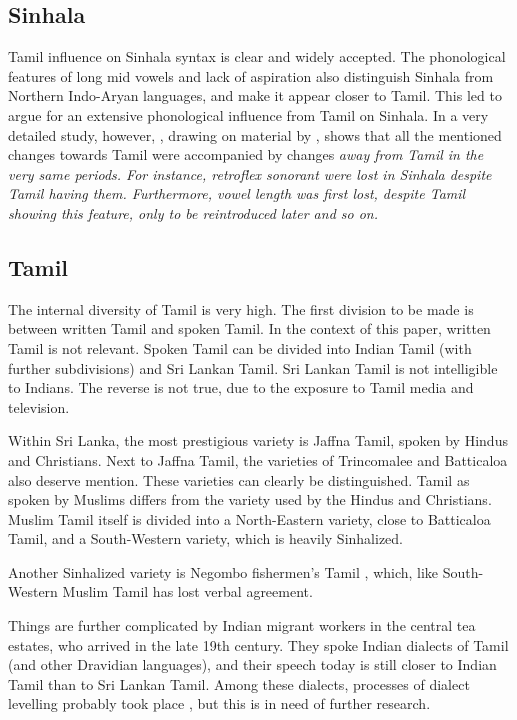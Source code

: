 \documentclass[handout,utf8]{article}
\begin{document}
\subsection{Sinhala}
Tamil influence on Sinhala syntax is clear and widely accepted. The phonological features of long mid vowels and lack of aspiration also distinguish Sinhala from Northern Indo-Aryan languages, and make it appear closer to Tamil. This led \citet{Elizarenkova1972} to argue for an extensive phonological influence from Tamil on Sinhala. In a very detailed study, however, \citet{Gair1976}, drawing on material by \citet{Karunatillake}, shows that all the mentioned changes towards Tamil were accompanied by changes \em away \em from Tamil in the very same periods. For instance, retroflex sonorant were lost in Sinhala despite Tamil having them. Furthermore, vowel length was first lost, despite Tamil showing this feature, only to be reintroduced later and so on.

\subsection{Tamil}
The internal diversity of Tamil is very high. The first division to be made is between written Tamil and spoken Tamil. In the context of this paper, written Tamil is not relevant. Spoken Tamil  can be divided into Indian Tamil (with further subdivisions) and Sri Lankan Tamil. Sri Lankan Tamil is not intelligible to Indians. The reverse is not true, due to the exposure to Tamil media and television. 

Within Sri Lanka, the most prestigious variety is Jaffna Tamil, spoken by Hindus and Christians. Next to Jaffna Tamil, the varieties of Trincomalee and Batticaloa also deserve mention. These varieties can clearly be distinguished. Tamil as spoken by Muslims differs from the variety used by the Hindus and Christians. Muslim Tamil itself is divided into a North-Eastern variety, close to Batticaloa Tamil, and a South-Western variety, which is heavily Sinhalized. 

Another Sinhalized variety is Negombo fishermen's Tamil \citep{Bonta}, which, like South-Western Muslim Tamil has lost verbal agreement. 

Things are further complicated by Indian migrant workers in the central tea estates, who arrived in the late 19th century. They spoke Indian dialects of Tamil (and other Dravidian languages), and their speech today is still closer to Indian Tamil than to Sri Lankan Tamil. Among these dialects, processes of dialect levelling probably took place \citet{abc}, but this is in need of further research. 
\end{document}
